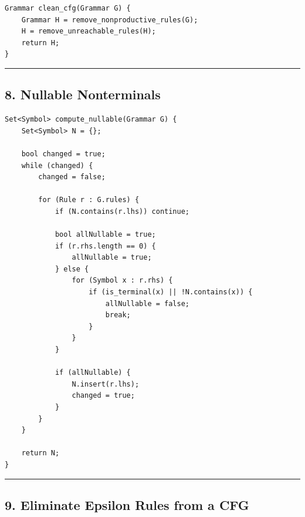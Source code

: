 \documentclass[10pt,letterpaper]{article}
\begin{document}
\begin{verbatim}
Grammar clean_cfg(Grammar G) {
    Grammar H = remove_nonproductive_rules(G);
    H = remove_unreachable_rules(H);
    return H;
}
\end{verbatim}

\medskip\hrule\medskip

\subsection*{8. Nullable Nonterminals}

\begin{verbatim}
Set<Symbol> compute_nullable(Grammar G) {
    Set<Symbol> N = {};

    bool changed = true;
    while (changed) {
        changed = false;

        for (Rule r : G.rules) {
            if (N.contains(r.lhs)) continue;

            bool allNullable = true;
            if (r.rhs.length == 0) {
                allNullable = true;
            } else {
                for (Symbol x : r.rhs) {
                    if (is_terminal(x) || !N.contains(x)) {
                        allNullable = false;
                        break;
                    }
                }
            }

            if (allNullable) {
                N.insert(r.lhs);
                changed = true;
            }
        }
    }

    return N;
}
\end{verbatim}

\medskip\hrule\medskip

\subsection*{9. Eliminate Epsilon Rules from a CFG}
\end{document}
